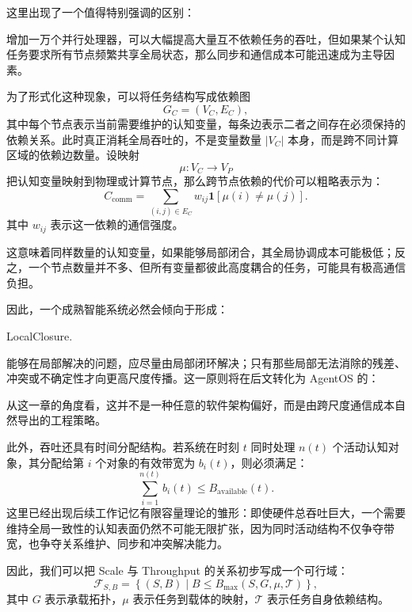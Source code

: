 这里出现了一个值得特别强调的区别：

\begin{statementbox}
\centering
{}
\end{statementbox}

增加一万个并行处理器，可以大幅提高大量互不依赖任务的吞吐，但如果某个认知任务要求所有节点频繁共享全局状态，那么同步和通信成本可能迅速成为主导因素。

为了形式化这种现象，可以将任务结构写成依赖图
\[
G_C=(V_C,E_C),
\]
其中每个节点表示当前需要维护的认知变量，每条边表示二者之间存在必须保持的依赖关系。此时真正消耗全局吞吐的，不是变量数量 $|V_C|$ 本身，而是跨不同计算区域的依赖边数量。设映射
\[
\mu:V_C\rightarrow V_P
\]
把认知变量映射到物理或计算节点，那么跨节点依赖的代价可以粗略表示为：
\[
C_{\mathrm{comm}}
=
\sum_{(i,j)\in E_C}
w_{ij}
\mathbf 1
\left[
\mu(i)\neq\mu(j)
\right].
\]
其中 $w_{ij}$ 表示这一依赖的通信强度。

这意味着同样数量的认知变量，如果能够局部闭合，其全局协调成本可能极低；反之，一个节点数量并不多、但所有变量都彼此高度耦合的任务，可能具有极高通信负担。

因此，一个成熟智能系统必然会倾向于形成：

\begin{statementbox}
LocalClosure.
\end{statementbox}

能够在局部解决的问题，应尽量由局部闭环解决；只有那些局部无法消除的残差、冲突或不确定性才向更高尺度传播。这一原则将在后文转化为 AgentOS 的：

\begin{statementbox}
\centering
{}
\end{statementbox}

从这一章的角度看，这并不是一种任意的软件架构偏好，而是由跨尺度通信成本自然导出的工程策略。

此外，吞吐还具有时间分配结构。若系统在时刻 $t$ 同时处理 $n(t)$ 个活动认知对象，其分配给第 $i$ 个对象的有效带宽为 $b_i(t)$，则必须满足：
\[
\sum_{i=1}^{n(t)}
b_i(t)
\leq
B_{\mathrm{available}}(t).
\]
这里已经出现后续工作记忆有限容量理论的雏形：即使硬件总吞吐巨大，一个需要维持全局一致性的认知表面仍然不可能无限扩张，因为同时活动结构不仅争夺带宽，也争夺关系维护、同步和冲突解决能力。

因此，我们可以把 Scale 与 Throughput 的关系初步写成一个可行域：
\[
\boxed{
\mathcal F_{S,B}
=
\left\{
(S,B)
\mid
B
\leq
B_{\max}(S,G,\mu,\mathcal T)
\right\},
}
\]
其中 $G$ 表示承载拓扑，$\mu$ 表示任务到载体的映射，$\mathcal T$ 表示任务自身依赖结构。

